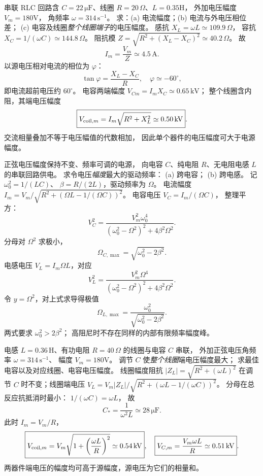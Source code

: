串联 RLC 回路含
$C=22\,\mathrm{\mu F}$、线圈
$R=20\,\Omega$、$L=0.35$H，
外加电压幅度 $V_m=180$V，
角频率 $\omega=314\,\mathrm{s^{-1}}$。
求：(a) 电流幅度；(b) 电流与外电压相位差；
(c) 电容及线圈\emph{整个线圈端子}的电压幅度。
\exsolution
感抗 $X_L=\omega L\simeq109.9\,\Omega$，
容抗 $X_C=1/(\omega C)\simeq144.8\,\Omega$。
阻抗模
$Z=\sqrt{R^2+(X_L-X_C)^2}\simeq40.2\,\Omega$。
故
\[
\boxed{I_m=\frac{V_m}{Z}\simeq4.5\,\mathrm A}.
\]
以源电压相对电流的相位为 $\varphi$：
\[
\boxed{\tan\varphi=\frac{X_L-X_C}{R}},
\quad\boxed{\varphi\simeq-60^\circ},
\]
即电流超前电压约 $60^\circ$。
电容两端幅度
$\boxed{V_{Cm}=I_mX_C\simeq0.65\,\mathrm{kV}}$；
整个线圈含内阻，其端电压幅度
\[
\boxed{V_{{\rm coil},m}
=I_m\sqrt{R^2+X_L^2}\simeq0.50\,\mathrm{kV}}.
\]
\excheck 交流相量叠加不等于电压幅值的代数相加，
因此单个器件的电压幅度可大于电源幅度。

正弦电压幅度保持不变、频率可调的电源，
向电容 $C$、纯电阻 $R$、无电阻电感 $L$ 的串联回路供电。
求令电压\emph{幅度}最大的驱动频率：
(a) 跨电容；
(b) 跨电感。
\exsolution
记 $\omega_0^2=1/(LC)$、
$\beta=R/(2L)$，驱动频率为 $\Omega$。
电流幅度
$I_m=V_m/\sqrt{R^2+(\Omega L-1/(\Omega C))^2}$。
电容电压
$V_C=I_m/(\Omega C)$，
整理平方：
\[
V_C^2=\frac{V_m^2\omega_0^4}
{(\omega_0^2-\Omega^2)^2+4\beta^2\Omega^2}.
\]
分母对 $\Omega^2$ 求极小，
\[
\boxed{\Omega_{C,\max}=
\sqrt{\omega_0^2-2\beta^2}}.
\]
电感电压
$V_L=I_m\Omega L$，对应
\[
V_L^2=\frac{V_m^2\Omega^4}
{(\omega_0^2-\Omega^2)^2+4\beta^2\Omega^2}.
\]
令 $y=\Omega^2$，对上式求导得极值
\[
\boxed{\Omega_{L,\max}
=\frac{\omega_0^2}
{\sqrt{\omega_0^2-2\beta^2}}}.
\]
\excheck 两式要求 $\omega_0^2>2\beta^2$；
高阻尼时不存在同样的内部有限频率幅度峰。

电感 $L=0.36\,\mathrm H$、有功电阻
$R=40\,\Omega$ 的线圈与电容 $C$ 串联，
外加正弦电压角频率 $\omega=314\,\mathrm{s^{-1}}$、
幅度 $V_m=180$V。
调节 $C$ 使\emph{整个线圈}端电压幅度最大；
求最佳电容以及对应线圈、电容电压幅度。
\exsolution
线圈幅度阻抗
$|Z_L|=\sqrt{R^2+(\omega L)^2}$
在调节 $C$ 时不变；线圈端电压
$V_L=V_m|Z_L|/
\sqrt{R^2+(\omega L-1/(\omega C))^2}$。
分母在总反应抗抵消时最小：
$1/(\omega C)=\omega L$，
故
\[
\boxed{C_*=\frac1{\omega^2L}
\simeq28\,\mathrm{\mu F}}.
\]
此时 $I_m=V_m/R$，
\[
\boxed{V_{{\rm coil},m}=
V_m\sqrt{1+\left(\frac{\omega L}{R}\right)^2}
\simeq0.54\,\mathrm{kV}},
\quad
\boxed{V_{C,m}=\frac{V_m\omega L}{R}
\simeq0.51\,\mathrm{kV}}.
\]
\excheck 两器件端电压的幅度均可高于源幅度，源电压为它们的相量和。

